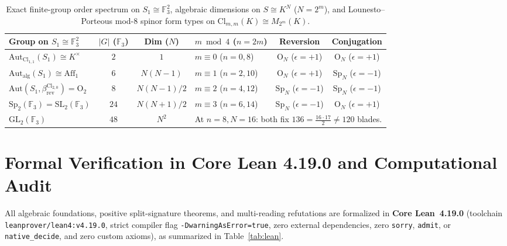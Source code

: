 \documentclass[11pt,a4paper]{article}
\theoremstyle{definition}
\newcommand{\Cl}{\mathrm{Cl}}
\newcommand{\Aut}{\mathrm{Aut}}
\newcommand{\GL}{\mathrm{GL}}
\newcommand{\SL}{\mathrm{SL}}
\newcommand{\Sp}{\mathrm{Sp}}
\newcommand{\Orth}{\mathrm{O}}
\newcommand{\Aff}{\mathrm{Aff}}
\begin{document}
\begin{table}[ht]
\centering
\footnotesize
\setlength{\tabcolsep}{4.5pt}
\renewcommand{\arraystretch}{1.2}
\caption{Exact finite-group order spectrum on $S_1 \cong \mathbb{F}_3^2$, algebraic dimensions on $S \cong K^N$ ($N = 2^m$), and Lounesto--Porteous mod-$8$ spinor form types on $\Cl_{m,m}(K) \cong M_{2^m}(K)$.}
\vspace{4pt}
\label{tab:spectrum}
\begin{tabular}{@{}lcclcc@{}}
\hline
\textbf{Group on $S_1 \cong \mathbb{F}_3^2$} & \textbf{$|G|$ ($\mathbb{F}_3$)} & \textbf{Dim ($N$)} & \textbf{$m \bmod 4$ ($n=2m$)} & \textbf{Reversion} & \textbf{Conjugation} \\
\hline
$\Aut_{\Cl_{1,1}}(S_1) \cong K^\times$ & $2$ & $1$ & $m \equiv 0$ ($n=0,8$) & $\Orth_N$ ($\epsilon=+1$) & $\Orth_N$ ($\epsilon=+1$) \\
$\Aut_{\text{alg}}(S_1) \cong \Aff_1$ & $6$ & $N(N-1)$ & $m \equiv 1$ ($n=2,10$) & $\Orth_N$ ($\epsilon=+1$) & $\Sp_N$ ($\epsilon=-1$) \\
$\Aut(S_1, \beta_{\mathrm{rev}}^{\Cl_{2,0}}) = \Orth_2$ & $8$ & $N(N-1)/2$ & $m \equiv 2$ ($n=4,12$) & $\Sp_N$ ($\epsilon=-1$) & $\Sp_N$ ($\epsilon=-1$) \\
$\Sp_2(\mathbb{F}_3) = \SL_2(\mathbb{F}_3)$ & $24$ & $N(N+1)/2$ & $m \equiv 3$ ($n=6,14$) & $\Sp_N$ ($\epsilon=-1$) & $\Orth_N$ ($\epsilon=+1$) \\
$\GL_2(\mathbb{F}_3)$ & $48$ & $N^2$ & \multicolumn{3}{l}{At $n=8, N=16$: both fix $136 = \frac{16\cdot 17}{2} \neq 120$ blades.} \\
\hline
\end{tabular}
\end{table}

\section{Formal Verification in Core Lean 4.19.0 and Computational Audit}\label{sec:verification}

All algebraic foundations, positive split-signature theorems, and multi-reading refutations are formalized in \textbf{Core Lean~4.19.0} (toolchain \nolinkurl{leanprover/lean4:v4.19.0}, strict compiler flag \nolinkurl{-DwarningAsError=true}, zero external dependencies, zero \texttt{sorry}, \texttt{admit}, or \nolinkurl{native_decide}, and zero custom axioms), as summarized in Table~\ref{tab:lean}.
\end{document}
